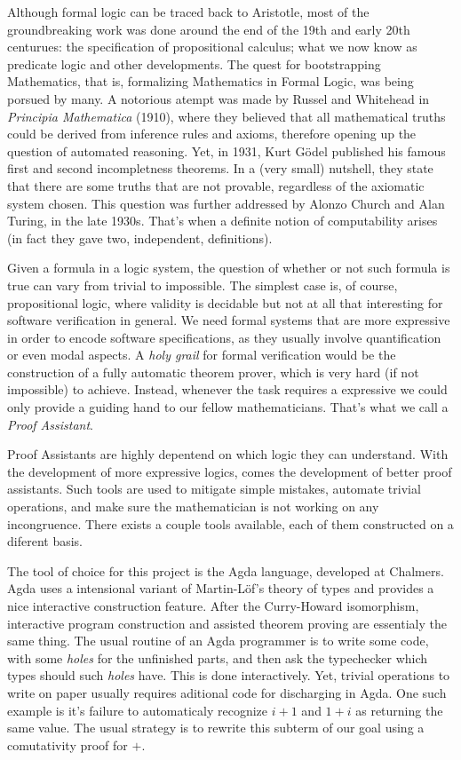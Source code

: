 Although formal logic can be traced back to Aristotle, most of the
groundbreaking work was done around the end of the 19th and early 20th centurues:
the specification of propositional calculus; what we now know as predicate logic and other developments. The quest for bootstrapping Mathematics, that is, formalizing Mathematics in Formal Logic, was
being porsued by many. A notorious atempt was made by Russel and Whitehead in \emph{Principia Mathematica} (1910), where they believed that all mathematical truths
could be derived from inference rules and axioms, therefore opening up the question of automated reasoning. Yet, in 1931, Kurt G\"{o}del published his famous first and second incompletness theorems. In a (very small) nutshell, they state that there are some truths that are not provable, regardless of the axiomatic system chosen. This question was further addressed by Alonzo Church and Alan Turing, in the late 1930s. That's when a definite notion of computability arises (in fact they gave two, independent, definitions). 

Given a formula in a logic system, the question of whether or not such formula is true can vary from trivial to impossible. The simplest case is, of course, propositional logic, where validity is decidable but not at all that interesting
for software verification in general. We need formal systems that are more expressive in order to encode software specifications, as they usually involve quantification or even modal aspects.  A \emph{holy grail} for formal verification would be the construction of a fully automatic theorem prover, which is very hard (if not impossible) to achieve. Instead, whenever the task requires a expressive we could only provide a guiding hand to our fellow mathematicians. That's what we call a \emph{Proof Assistant}.

Proof Assistants are highly depentend on which logic they can understand. With the development of more
expressive logics, comes the development of better proof assistants. Such tools are used to mitigate
simple mistakes, automate trivial operations, and make sure the mathematician is not working
on any incongruence. There exists a couple tools available, each of them constructed on a diferent
basis. 

The tool of choice for this project is the Agda language, developed at Chalmers. Agda uses a intensional
variant of Martin-L\"{o}f's theory of types and provides a nice interactive construction feature. After
the Curry-Howard isomorphism, interactive program construction and assisted theorem proving are essentialy
the same thing. The usual routine of an Agda programmer is to write some code, with some \emph{holes} for
the unfinished parts, and then ask the typechecker which types should such \emph{holes} have. This is done
interactively. Yet, trivial operations to write on paper usually requires aditional code
for discharging in Agda. One such example is it's failure to automaticaly recognize $i + 1$ and
$1 + i$ as returning the same value. The usual strategy is to rewrite this subterm of our goal
using a comutativity proof for $+$. 

